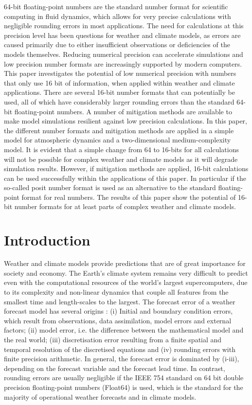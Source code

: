 \documentclass[draft]{agujournal2019}
\begin{document}
64-bit floating-point numbers are the standard number format for scientific computing in fluid dynamics, which allows for very precise calculations with negligible rounding errors in most applications. The need for calculations at this precision level has been questions for weather and climate models, as errors are caused primarily due to either insufficient observations or deficiencies of the models themselves. Reducing numerical precision can accelerate simulations and low precision number formats are increasingly supported by modern computers. This paper investigates the potential of low numerical precision with numbers that only use 16 bit of information, when applied within weather and climate applications. There are several 16-bit number formats that can potentially be used, all of which have considerably larger rounding errors than the standard 64-bit floating-point numbers. A number of mitigation methods are available to make model simulations resilient against low precision calculations. In this paper, the different number formats and mitigation methods are applied in a simple model for atmospheric dynamics and a two-dimensional medium-complexity model. It is evident that a simple change from 64 to 16-bits for all calculations will not be possible for complex weather and climate models as it will degrade simulation results. However, if mitigation methods are applied, 16-bit calculations can be used successfully within the applications of this paper. In particular if the so-called posit number format is used as an alternative to the standard floating-point format for real numbers. The results of this paper show the potential of 16-bit number formats for at least parts of complex weather and climate models.

\section{Introduction}
\label{sec:intro}

Weather and climate models provide predictions that are of great importance for society and economy. The Earth's climate system remains very difficult to predict even with the computational resources of the world's largest supercomputers, due to its complexity and non-linear dynamics that couple all features from the smallest time and length-scales to the largest. The forecast error of a weather forecast model has several origins \cite{Palmer2012,Palmer2015}: (i) Initial and boundary condition errors, which result from observations, data assimilation, model errors and external factors; (ii) model error, i.e. the difference between the mathematical model and the real world; (iii) discretisation error resulting from a finite spatial and temporal resolution of the discretised equations and (iv) rounding errors with finite precision arithmetic. In general, the forecast error is dominated by (i-iii), depending on the forecast variable and the forecast lead time. In contrast, rounding errors are usually negligible if the IEEE 754 standard on 64 bit double precision floating-point numbers (Float64) is used, which is the standard for the majority of operational weather forecasts and in climate models.
\end{document}
